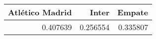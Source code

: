 \begin{tabular}{rrr}
\hline
   Atlético Madrid &    Inter &   Empate \\
\hline
          0.407639 & 0.256554 & 0.335807 \\
\hline
\end{tabular}